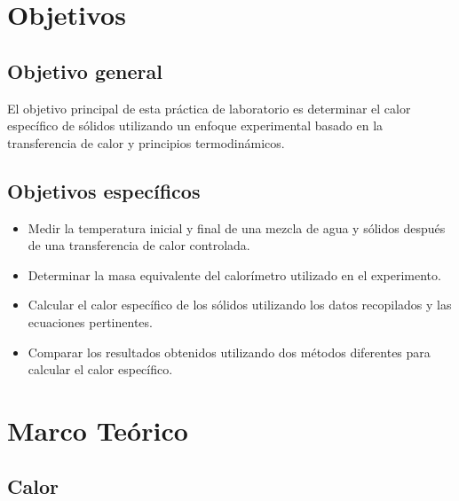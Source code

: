 \documentclass[letterpaper, 12pt]{article}
\begin{document}
\section{Objetivos}

\subsection{Objetivo general}

El objetivo principal de esta práctica de laboratorio es
determinar el calor específico de sólidos utilizando un
enfoque experimental basado en la transferencia de calor y
principios termodinámicos.

\subsection{Objetivos específicos}

\begin{itemize}[label=$\triangleright$]
      \item Medir la temperatura inicial y final de una mezcla de agua
            y sólidos después de una transferencia de calor controlada.

      \item Determinar la masa equivalente del calorímetro utilizado en
            el experimento.

      \item Calcular el calor específico de los sólidos utilizando los
            datos recopilados y las ecuaciones pertinentes.

      \item Comparar los resultados obtenidos utilizando dos métodos
            diferentes para calcular el calor específico.
\end{itemize}

\section{Marco Teórico}

\subsection{Calor~\cite{Fernández}}
\end{document}
